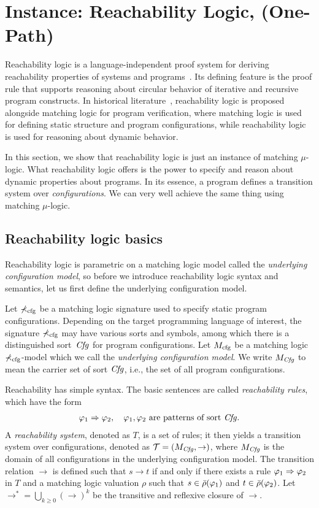 \documentclass{amsart}
\begin{document}
\section{Instance: Reachability Logic, (One-Path)}

Reachability logic is a language-independent proof system for deriving
reachability properties
of systems and programs~\cite{bibid}.
Its defining feature is the \circularity proof rule that supports reasoning
about
circular behavior of iterative and recursive program constructs.
In historical literature~\cite{bibid},
reachability logic is proposed alongside matching logic for program
verification,
where matching logic is used for defining static structure and
program configurations, while reachability logic is used for reasoning about
dynamic behavior.


In this section, we show that reachability logic
is just an instance of matching $\mu$-logic.
What reachability logic offers is the power to specify and reason about
dynamic properties about programs.
In its essence, a program defines a transition system over \emph{configurations}.
We can very well achieve the same thing using matching $\mu$-logic.

\subsection{Reachability logic basics}

Reachability logic is parametric on a matching logic model called
the \emph{underlying configuration model},
so before we introduce reachability logic syntax and semantics,
let us first define the underlying configuration model.

Let $\mathbb{\Sigma}_{\mathrm{cfg}}$ be a matching logic signature 
used to specify static program configurations.
Depending on the target programming language of interest,
the signature $\mathbb{\Sigma}_{\mathrm{cfg}}$
may have various sorts and symbols, among which there is 
a distinguished sort~$\mathit{Cfg}$ for program configurations. 
Let $M_{\mathrm{cfg}}$ be a matching logic $\mathbb{\Sigma}_{\mathrm{cfg}}$-model
which we call the \emph{underlying configuration model}.
We write $M_{\mathit{Cfg}}$ to mean the carrier set of sort $\mathit{Cfg}$,
i.e., the set of all program configurations. 

Reachability has simple syntax.
The basic sentences are called \emph{reachability rules}, which have the form
\begin{align}
\varphi_1 \Rightarrow \varphi_2, \quad \text{$\varphi_1,\varphi_2$ are patterns of sort $\mathit{Cfg}$}.
\end{align}
A \emph{reachability system}, denoted as $T$, is a set of rules;
it then yields a transition system over configurations,
denoted as $\mathcal{T} = (M_{\mathit{Cfg}}, \to)$,
where $M_{\mathit{Cfg}}$ is the domain of all configurations in the
underlying configuration model.
The transition relation $\to$ is defined such that
$s \to t$ if and only if
there exists a rule $\varphi_1 \Rightarrow \varphi_2$ in $T$
and a matching logic valuation $\rho$ such that
$s \in \bar{\rho}(\varphi_1)$ and $t \in \bar{\rho}(\varphi_2)$.
Let $\to^* = \bigcup_{k \ge 0} (\to)^k$ 
be the transitive and reflexive closure of ${\to}$.
\end{document}

